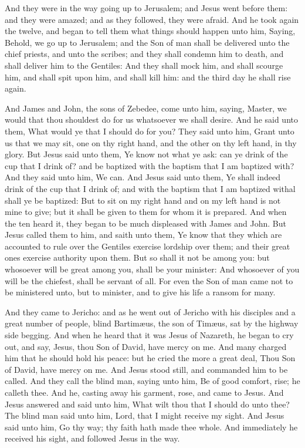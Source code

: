  And they were in the way going up to Jerusalem; and Jesus
went before them: and they were amazed; and as they followed, they were
afraid. And he took again the twelve, and began to tell them what things
should happen unto him,  Saying, Behold, we go up to
Jerusalem; and the Son of man shall be delivered unto the chief priests,
and unto the scribes; and they shall condemn him to death, and shall
deliver him to the Gentiles:  And they shall mock him, and
shall scourge him, and shall spit upon him, and shall kill him: and the
third day he shall rise again.

 And James and John, the sons of Zebedee, come unto him,
saying, Master, we would that thou shouldest do for us whatsoever we
shall desire.  And he said unto them, What would ye that I
should do for you?  They said unto him, Grant unto us that
we may sit, one on thy right hand, and the other on thy left hand, in
thy glory.  But Jesus said unto them, Ye know not what ye
ask: can ye drink of the cup that I drink of? and be baptized with the
baptism that I am baptized with?  And they said unto him,
We can. And Jesus said unto them, Ye shall indeed drink of the cup that
I drink of; and with the baptism that I am baptized withal shall ye be
baptized:  But to sit on my right hand and on my left hand
is not mine to give; but it shall be given to them for whom it is
prepared.  And when the ten heard it, they began to be much
displeased with James and John.  But Jesus called them to
him, and saith unto them, Ye know that they which are accounted to rule
over the Gentiles exercise lordship over them; and their great ones
exercise authority upon them.  But so shall it not be among
you: but whosoever will be great among you, shall be your minister:
 And whosoever of you will be the chiefest, shall be
servant of all.  For even the Son of man came not to be
ministered unto, but to minister, and to give his life a ransom for
many.

 And they came to Jericho: and as he went out of Jericho
with his disciples and a great number of people, blind Bartimæus, the
son of Timæus, sat by the highway side begging.  And when
he heard that it was Jesus of Nazareth, he began to cry out, and say,
Jesus, thou Son of David, have mercy on me.  And many
charged him that he should hold his peace: but he cried the more a great
deal, Thou Son of David, have mercy on me.  And Jesus stood
still, and commanded him to be called. And they call the blind man,
saying unto him, Be of good comfort, rise; he calleth thee.
 And he, casting away his garment, rose, and came to Jesus.
 And Jesus answered and said unto him, What wilt thou that
I should do unto thee? The blind man said unto him, Lord, that I might
receive my sight.  And Jesus said unto him, Go thy way; thy
faith hath made thee whole. And immediately he received his sight, and
followed Jesus in the way.

